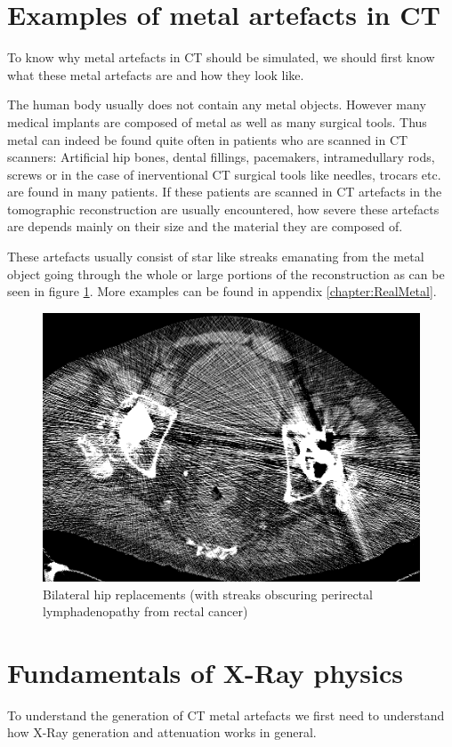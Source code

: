 \section{Examples of metal artefacts in CT}
\par To know why metal artefacts in CT should be simulated, we should first know what these metal artefacts are and how they look like.
\par The human body usually does not contain any metal objects. However many medical implants are composed of metal as well as many surgical tools. Thus metal can indeed be found quite often in patients who are scanned in CT scanners: Artificial hip bones, dental fillings, pacemakers, intramedullary rods, screws or in the case of inerventional CT surgical tools like needles, trocars etc. are found in many patients. If these patients are scanned in CT artefacts in the tomographic reconstruction are usually encountered, how severe these artefacts are depends mainly on their size and the material they are composed of.
\par These artefacts usually consist of star like streaks emanating from the metal object going through the whole or large portions of the reconstruction as can be seen in figure \ref{BilateralHipReplacements}. More examples can be found in appendix \ref{chapter:RealMetal}.
\begin{figure}[h!]
	\centering
	\includegraphics[width=0.5\linewidth]{images/12_FBP.png}
	\caption{Bilateral hip replacements (with streaks obscuring perirectal lymphadenopathy from rectal cancer)\cite{revisionrads}}
	\label{BilateralHipReplacements}
\end{figure}
\section{Fundamentals of X-Ray physics}
\par To understand the generation of CT metal artefacts we first need to understand how X-Ray generation and attenuation works in general.
